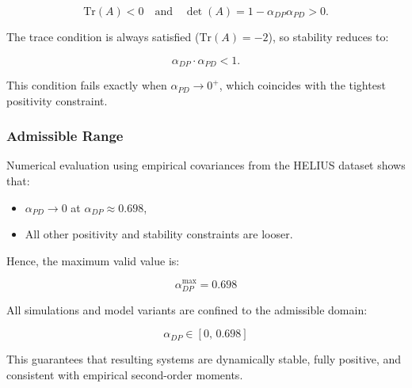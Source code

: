 \documentclass[
]{article}
\providecommand{\tightlist}{%
  \setlength{\itemsep}{0pt}\setlength{\parskip}{0pt}}\usepackage{longtable,booktabs,array}
\begin{document}
\[
\text{Tr}(A) < 0 \quad \text{and} \quad \det(A) = 1 - \alpha_{DP} \alpha_{PD} > 0.
\]

The trace condition is always satisfied (\(\text{Tr}(A) = -2\)), so
stability reduces to:

\[
\alpha_{DP} \cdot \alpha_{PD} < 1.
\]

This condition fails exactly when \(\alpha_{PD} \to 0^+\), which
coincides with the tightest positivity constraint.

\subsubsection{Admissible Range}\label{admissible-range}

Numerical evaluation using empirical covariances from the HELIUS dataset
shows that:

\begin{itemize}
\tightlist
\item
  \(\alpha_{PD} \to 0\) at \(\alpha_{DP} \approx 0.698\),
\item
  All other positivity and stability constraints are looser.
\end{itemize}

Hence, the maximum valid value is:

\[
\boxed{\alpha_{DP}^{\max} = 0.698}
\]

All simulations and model variants are confined to the admissible
domain:

\[
\alpha_{DP} \in [0,\, 0.698]
\]

This guarantees that resulting systems are dynamically stable, fully
positive, and consistent with empirical second-order moments.
\end{document}
